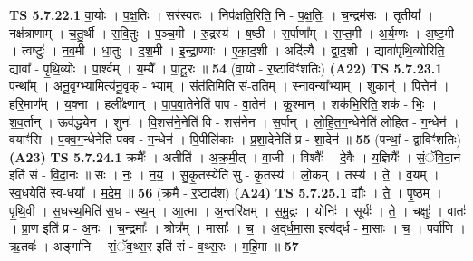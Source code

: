 \documentclass[17pt]{extarticle}
\begin{document}
                                \textbf{ TS 5.7.22.1} \newline
                  वा॒योः । प॒क्ष॒तिः । सर॑स्वतः । निप॑क्षति॒रिति॒ नि - प॒क्ष॒तिः॒ । च॒न्द्रम॑सः । तृ॒तीया᳚ । नक्ष॑त्राणाम् । च॒तु॒र्थी । स॒वि॒तुः । प॒ञ्च॒मी । रु॒द्रस्य॑ । ष॒ष्ठी । स॒र्पाणा᳚म् । स॒प्त॒मी । अ॒र्य॒म्णः । अ॒ष्ट॒मी । त्वष्टुः॑ । न॒व॒मी । धा॒तुः । द॒श॒मी । इ॒न्द्रा॒ण्याः । ए॒का॒द॒शी । अदि॑त्यै । द्वा॒द॒शी । द्यावा॑पृथि॒व्योरिति॒ द्यावा᳚ - पृ॒थि॒व्योः । पा॒र्श्वम् । य॒म्यै᳚ । पा॒टू॒रः ॥ \textbf{  54 } \newline
                  \newline
                      (वा॒यो - र॒ष्टाविꣳ॑शतिः)  \textbf{(A22)} \newline \newline
                                \textbf{ TS 5.7.23.1} \newline
                  पन्था᳚म् । अ॒नू॒वृग्भ्या॒मित्य॑नू॒वृक् - भ्या॒म् । संत॑ति॒मिति॒ सं-त॒ति॒म् । स्ना॒व॒न्या᳚भ्याम् । शुकान्॑ । पि॒त्तेन॑ । ह॒रि॒माण᳚म् । य॒क्ना । हली᳚क्ष्णान् । पा॒प॒वा॒तेनेति॑ पाप - वा॒तेन॑ । कू॒श्मान् । शक॑भि॒रिति॒ शक॑ - भिः॒ । श॒व॒र्तान् । ऊव॑द्ध्येन । शुनः॑ । वि॒शस॑ने॒नेति॑ वि - शस॑नेन । स॒र्पान् । लो॒हि॒त॒ग॒न्धेनेति॑ लोहित - ग॒न्धेन॑ । वयाꣳ॑सि । प॒क्व॒ग॒न्धेनेति॑ पक्व - ग॒न्धेन॑ । पि॒पीलि॑काः । प्र॒शा॒देनेति॑ प्र - शा॒देन॑ ॥ \textbf{  55 } \newline
                  \newline
                      (पन्थां॒ - द्वाविꣳ॑शतिः)  \textbf{(A23)} \newline \newline
                                \textbf{ TS 5.7.24.1} \newline
                  क्रमैः᳚ । अतीति॑ । अ॒क्र॒मी॒त् । वा॒जी । विश्वैः᳚ । दे॒वैः । य॒ज्ञियैः᳚ । सं॒ॅवि॒दा॒न इति॑ सं - वि॒दा॒नः ॥ सः । नः॒ । न॒य॒ । सु॒कृ॒तस्येति॑ सु - कृ॒तस्य॑ । लो॒कम् । तस्य॑ । ते॒ । व॒यम् । स्व॒धयेति॑ स्व-धया᳚ । म॒दे॒म॒ ॥ \textbf{  56} \newline
                  \newline
                      (क्रमै॑ - र॒ष्टाद॑श)  \textbf{(A24)} \newline \newline
                                \textbf{ TS 5.7.25.1} \newline
                  द्यौः । ते॒ । पृ॒ष्ठम् । पृ॒थि॒वी । स॒धस्थ॒मिति॑ स॒ध - स्थ॒म् । आ॒त्मा । अ॒न्तरि॑क्षम् । स॒मु॒द्रः । योनिः॑ । सूर्यः॑ । ते॒ । चक्षुः॑ । वातः॑ । प्रा॒ण इति॑ प्र - अ॒नः । च॒न्द्रमाः᳚ । श्रोत्र᳚म् । मासाः᳚ । च॒ । अ॒द्‌र्ध॒मा॒सा इत्य॑द्‌र्ध - मा॒साः । च॒ । पर्वा॑णि । ऋ॒तवः॑ । अङ्गा॑नि । सं॒ॅव॒थ्स॒र इति॑ सं - व॒थ्स॒रः । म॒हि॒मा ॥ \textbf{  57} \newline
\end{document}
